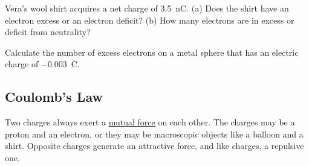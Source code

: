 \documentclass[dvipsnames]{article}
\numberwithin{equation}{section}
\numberwithin{figure}{section}
\begin{document}
\begin{exercise} \label{994stj}
    Vera's wool shirt acquires a net charge of \SI{3.5}{nC}. (a) Does the shirt have an electron excess or an electron deficit? (b) How many electrons are in excess or deficit from neutrality?
\end{exercise}

\begin{exercise} \label{IRX4Zr}
    Calculate the number of excess electrons on a metal sphere that has an electric charge of \qty{-0.003}{C}.
\end{exercise}






\cyanhrule

\subsection{Coulomb's Law} \label{fKC05f}

Two charges always exert a \href{https://phet.colorado.edu/en/simulations/coulombs-law}{mutual force} on each other. The charges may be a proton and an electron, or they may be macroscopic objects like a balloon and a shirt. Opposite charges generate an attractive force, and like charges, a repulsive one. 


\def\distanceA{5}
\def\distanceR{2}
\end{document}
